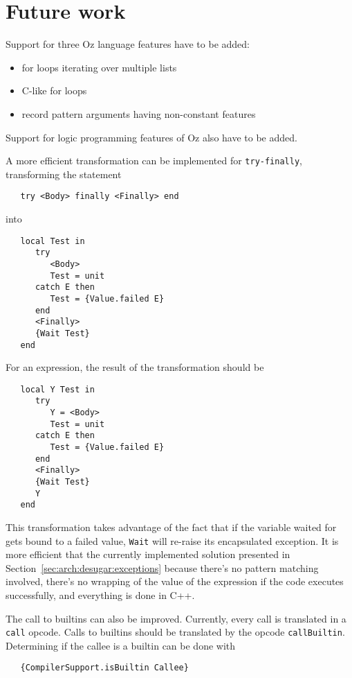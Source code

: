 \documentclass[a4paper]{memoir}
\begin{document}
\section{Future work}\label{sec:futurework}

Support for three Oz language features have to be added:
\begin{itemize}
  \item for loops iterating over multiple lists
  \item C-like for loops
  \item record pattern arguments having non-constant features
\end{itemize}

Support for logic programming features of Oz also have to be added.

A more efficient transformation can be implemented for \lstinline!try-finally!, 
transforming the statement
\begin{lstlisting}
   try <Body> finally <Finally> end
\end{lstlisting}
into
\begin{lstlisting}
   local Test in
      try
         <Body>
         Test = unit
      catch E then
         Test = {Value.failed E}
      end
      <Finally>
      {Wait Test}
   end
\end{lstlisting}

For an expression, the result of the transformation should be
\begin{lstlisting}
   local Y Test in
      try
         Y = <Body>
         Test = unit
      catch E then
         Test = {Value.failed E}
      end
      <Finally>
      {Wait Test}
      Y
   end
\end{lstlisting}
This transformation takes advantage of the fact that if the variable waited for
gets bound to a failed value, \lstinline!Wait! will re-raise its encapsulated
exception. 
It is more efficient that the currently implemented solution presented in Section~\ref{sec:arch:desugar:exceptions} because
there's no pattern matching involved,
there's no wrapping of the value of the expression if the code executes successfully, and everything is done in C++.


The call to builtins can also be improved. Currently, every call is translated in a \lstinline!call! opcode. Calls to builtins should
be translated by the opcode \lstinline!callBuiltin!. Determining if the callee is a builtin can be done with 
\begin{lstlisting}
   {CompilerSupport.isBuiltin Callee}
\end{lstlisting}
\end{document}
